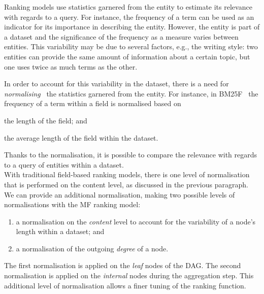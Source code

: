 Ranking models use statistics garnered from the entity to estimate its relevance with regards to a query. For instance, the frequency of a term can be used as an indicator for its importance in describing the entity. However, the entity is part of a dataset and the significance of the frequency as a measure varies between entities. This variability may be due to several factors, e.g., the writing style: two entities can provide the same amount of information about a certain topic, but one uses twice as much terms as the other.

In order to account for this variability in the dataset, there is a need for \emph{normalising}~\cite{manning:2008:iir} the statistics garnered from the entity. For instance, in BM25F~\cite{zaragoza:2004:microsoft} the frequency of a term within a field is normalised based on
\begin{inparaenum}[(a)]
	\item the length of the field; and
	\item the average length of the field within the dataset.
\end{inparaenum}
Thanks to the normalisation, it is possible to compare the relevance with regards to a query of entities within a dataset.\\

With traditional field-based ranking models, there is one level of normalisation that is performed on the content level, as discussed in the previous paragraph.
We can provide an additional normalisation, making two possible levels of normalisations with the \gls{MF} ranking model:
\begin{enumerate}
	\item a normalisation on the \emph{content} level to account for the variability of a node's length within a dataset; and
	\label{chap6:ranking:norm:content}
	\item a normalisation of the outgoing \emph{degree} of a node.
	\label{chap6:ranking:norm:degree}
\end{enumerate}
The first normalisation is applied on the \emph{leaf} nodes of the DAG. The second normalisation is applied on the \emph{internal} nodes during the aggregation step. This additional level of normalisation allows a finer tuning of the ranking function.

